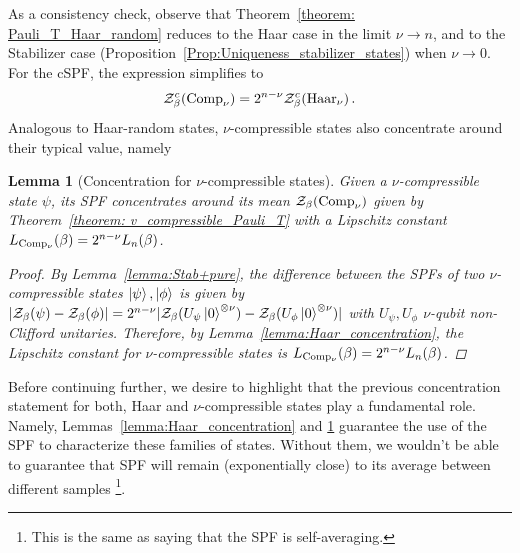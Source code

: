 \documentclass[aps,pra,superscriptaddress,twocolumn,longbibliography]{revtex4-2}
\newtheorem{lemma}{\textbf{Lemma}}
\def\mZ{\mathcal{Z}}
\begin{document}
As a consistency check, observe that Theorem~\ref{theorem: Pauli_T_Haar_random} reduces to the Haar case in the limit $\nu \to n$, and to the Stabilizer case (Proposition~\ref{Prop:Uniqueness_stabilizer_states}) when $\nu \to 0$. 
For the cSPF, the expression simplifies to $$\mZ^c_{\beta}({\rm Comp}_{\nu}) = 2^{n-\nu}\mZ^c_{\beta}({\rm Haar}_{\nu})\,.$$
Analogous to Haar-random states, $\nu$-compressible states also concentrate around their typical value, namely 
\begin{lemma}[Concentration for $\nu$-compressible states]\label{lemma:compressible_concentration}
Given a $\nu$-compressible state $\psi$, its SPF concentrates around its mean $\mathcal{Z}_{\beta}({\rm Comp}_{\nu})$ given by Theorem~\ref{theorem: v_compressible_Pauli_T} with a Lipschitz constant $L_{\rm Comp_{\nu}}(\beta)=2^{n-\nu}L_{n}(\beta)$.

\begin{proof}
    By Lemma~\ref{lemma:Stab+pure}, the difference between the SPFs of two $\nu$-compressible states $\ket{\psi},\ket{\phi}$ is given by $\lvert\mathcal{Z}_{\beta}(\psi)-\mathcal{Z}_{\beta}(\phi)\rvert=2^{n-\nu}\lvert\mathcal{Z}_{\beta}(U_{\psi}\ket{0}^{\otimes \nu})-\mathcal{Z}_{\beta}(U_{\phi}\ket{0}^{\otimes \nu})\rvert$ with $U_{\psi},U_{\phi}$ $\nu$-qubit non-Clifford unitaries. Therefore, by Lemma~\ref{lemma:Haar_concentration}, the Lipschitz constant for $\nu$-compressible states is $L_{\rm Comp_{\nu}}(\beta)=2^{n-\nu}L_{n}(\beta)$.
\end{proof}
    
\end{lemma}

Before continuing further, we desire to highlight that the previous concentration statement for both, Haar and $\nu$-compressible states play a fundamental role. Namely, Lemmas~\ref{lemma:Haar_concentration} and \ref{lemma:compressible_concentration} guarantee the use of the SPF to characterize these families of states. Without them, we wouldn't be able to guarantee that SPF will remain (exponentially close) to its average between different samples \footnote{This is the same as saying that the SPF is self-averaging.}. 
\end{document}
